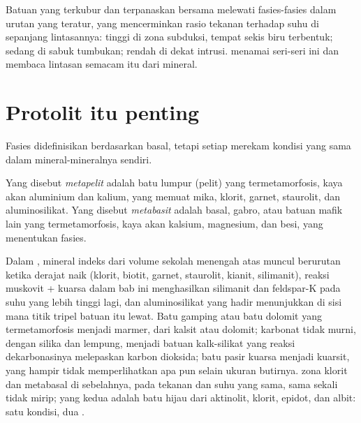 Batuan yang terkubur dan terpanaskan bersama melewati fasies-fasies dalam urutan yang teratur, yang
mencerminkan rasio tekanan terhadap suhu di sepanjang lintasannya: tinggi di zona
subduksi, tempat sekis biru terbentuk; sedang di sabuk tumbukan; rendah di dekat intrusi.
 menamai seri-seri ini dan membaca lintasan semacam itu dari mineral.

\section{Protolit itu penting}\label{sec:b2:metamorphic-facies:protoliths}

Fasies didefinisikan berdasarkan basal, tetapi setiap  merekam kondisi yang sama dalam
mineral-mineralnya sendiri.

\begin{definition}\label{def:b2:metamorphic-facies:protoliths}
Yang disebut \emph{metapelit} adalah batu lumpur (pelit) yang termetamorfosis, kaya akan
aluminium dan kalium, yang  memuat mika, klorit, garnet, staurolit, dan
aluminosilikat. Yang disebut \emph{metabasit} adalah basal,
gabro, atau batuan mafik lain yang termetamorfosis, kaya akan kalsium, magnesium, dan besi, yang  menentukan
fasies.
\end{definition}

Dalam , mineral indeks dari volume sekolah menengah atas muncul berurutan ketika
derajat  naik (klorit, biotit, garnet, staurolit, kianit, silimanit), reaksi
muskovit + kuarsa dalam bab ini menghasilkan silimanit dan feldspar-K pada suhu
yang lebih tinggi lagi, dan aluminosilikat yang hadir menunjukkan di sisi mana titik
tripel batuan itu lewat. Batu gamping atau batu dolomit yang termetamorfosis menjadi marmer, dari kalsit atau
dolomit; karbonat tidak murni, dengan silika dan lempung, menjadi batuan kalk-silikat yang
reaksi dekarbonasinya melepaskan karbon dioksida; batu pasir kuarsa menjadi kuarsit,
yang hampir tidak memperlihatkan apa pun selain ukuran butirnya.  zona klorit dan
metabasal di sebelahnya, pada tekanan dan suhu yang sama, sama sekali tidak mirip;
yang kedua adalah batu hijau dari aktinolit, klorit, epidot, dan albit: satu kondisi,
dua .

